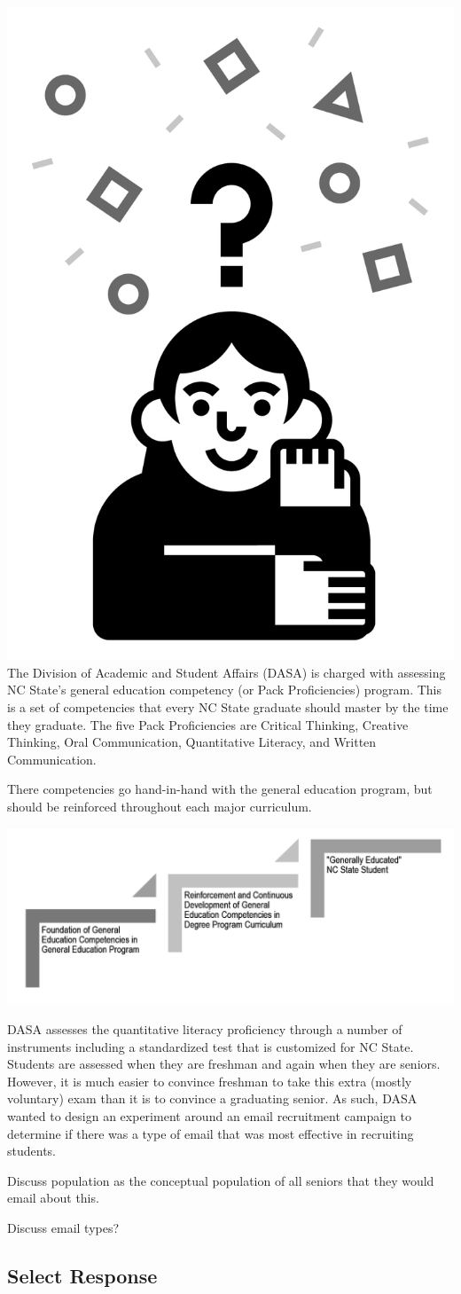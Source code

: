 \documentclass[
]{book}
\theoremstyle{definition}
\theoremstyle{definition}
\theoremstyle{definition}
\theoremstyle{remark}
\begin{document}
\includegraphics[width=0.13\linewidth,style="float:left; padding:10px"]{img/defineObjective}
The Division of Academic and Student Affairs (DASA) is charged with assessing NC State's general education competency (or Pack Proficiencies) program. This is a set of competencies that every NC State graduate should master by the time they graduate. The five Pack Proficiencies are Critical Thinking, Creative Thinking, Oral Communication, Quantitative Literacy, and Written Communication.

There competencies go hand-in-hand with the general education program, but should be reinforced throughout each major curriculum.

\begin{center}\includegraphics[width=0.7\linewidth]{img/GEP-and-Gen-Ed-Diagram} \end{center}

DASA assesses the quantitative literacy proficiency through a number of instruments including a standardized test that is customized for NC State. Students are assessed when they are freshman and again when they are seniors. However, it is much easier to convince freshman to take this extra (mostly voluntary) exam than it is to convince a graduating senior. As such, DASA wanted to design an experiment around an email recruitment campaign to determine if there was a type of email that was most effective in recruiting students.

Discuss population as the conceptual population of all seniors that they would email about this.

Discuss email types?

\hypertarget{select-response-1}{%
\subsection{Select Response}\label{select-response-1}}
\end{document}
